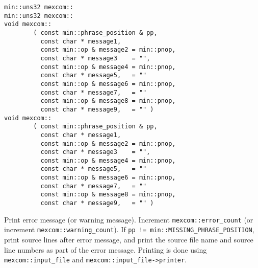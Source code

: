 \documentclass[12pt]{article}
\begin{document}
\verb|min::uns32 mexcom::|  \\
\verb|min::uns32 mexcom::|  \\
\verb|void mexcom::|  \\
\verb|        ( const min::phrase_position & pp,| \\
\verb|          const char * message1,| \\
\verb|          const min::op & message2 = min::pnop,| \\
\verb|          const char * message3    = "",| \\
\verb|          const min::op & message4 = min::pnop,| \\
\verb|          const char * message5,   = ""| \\
\verb|          const min::op & message6 = min::pnop,| \\
\verb|          const char * message7,   = ""| \\
\verb|          const min::op & message8 = min::pnop,| \\
\verb|          const char * message9,   = "" )| \\
\verb|void mexcom::|  \\
\verb|        ( const min::phrase_position & pp,| \\
\verb|          const char * message1,| \\
\verb|          const min::op & message2 = min::pnop,| \\
\verb|          const char * message3    = "",| \\
\verb|          const min::op & message4 = min::pnop,| \\
\verb|          const char * message5,   = ""| \\
\verb|          const min::op & message6 = min::pnop,| \\
\verb|          const char * message7,   = ""| \\
\verb|          const min::op & message8 = min::pnop,| \\
\verb|          const char * message9,   = "" )|
\begin{indpar}
Print error message (or warning message).  Increment
{\tt mexcom::error\_count} (or increment {\tt mexcom::\EOL warning\_count}).
If {\tt pp != min::\EOL MISSING\_\EOL PHRASE\_\EOL POSITION},
print source lines after error message, and print the source file name and
source line numbers as part of the error message.  Printing is done using
{\tt mexcom::\EOL input\_\EOL file} and
{\tt mexcom::\EOL input\_\EOL file->\EOL printer}.
\end{indpar}
\end{document}
